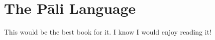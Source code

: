 \chapter{The Pāli Language}


This would be the best book for it. I know I would enjoy reading it!

